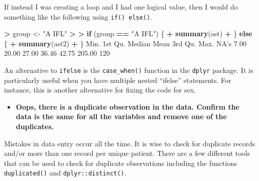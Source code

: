 \documentclass[
]{book}
\newenvironment{Shaded}{\begin{snugshade}}{\end{snugshade}}
\newcommand{\ControlFlowTok}[1]{\textcolor[rgb]{0.13,0.29,0.53}{\textbf{#1}}}
\newcommand{\DecValTok}[1]{\textcolor[rgb]{0.00,0.00,0.81}{#1}}
\newcommand{\ErrorTok}[1]{\textcolor[rgb]{0.64,0.00,0.00}{\textbf{#1}}}
\newcommand{\KeywordTok}[1]{\textcolor[rgb]{0.13,0.29,0.53}{\textbf{#1}}}
\newcommand{\NormalTok}[1]{#1}
\newcommand{\OperatorTok}[1]{\textcolor[rgb]{0.81,0.36,0.00}{\textbf{#1}}}
\newcommand{\OtherTok}[1]{\textcolor[rgb]{0.56,0.35,0.01}{#1}}
\newcommand{\StringTok}[1]{\textcolor[rgb]{0.31,0.60,0.02}{#1}}
\providecommand{\tightlist}{%
  \setlength{\itemsep}{0pt}\setlength{\parskip}{0pt}}
\begin{document}
If instead I was creating a loop and I had one logical value, then I would do something like the following using \texttt{if()\ else()}.

\begin{Shaded}
\begin{Highlighting}[]
\OperatorTok{>}\StringTok{ }\NormalTok{group <-}\StringTok{ "A IFL"}
\OperatorTok{>}\StringTok{ }
\ErrorTok{>}\StringTok{ }\ControlFlowTok{if}\NormalTok{ (group }\OperatorTok{==}\StringTok{ "A IFL"}\NormalTok{) \{}
\OperatorTok{+}\StringTok{     }\KeywordTok{summary}\NormalTok{(ast)}
\OperatorTok{+}\StringTok{ }\NormalTok{\} }\ControlFlowTok{else}\NormalTok{ \{}
\OperatorTok{+}\StringTok{     }\KeywordTok{summary}\NormalTok{(ast2)}
\OperatorTok{+}\StringTok{ }\NormalTok{\}}
\NormalTok{   Min. 1st Qu.  Median    Mean 3rd Qu.    Max.    NA}\StringTok{'s }
\StringTok{   7.00   20.00   27.00   36.46   42.75  205.00     120 }
\end{Highlighting}
\end{Shaded}

An alternative to \texttt{ifelse} is the \texttt{case\_when()} function in the \texttt{dplyr} package. It is particularly useful when you have multiple nested ``ifelse'' statements. For instance, this is another alternative for fixing the code for sex.

\begin{Shaded}
\end{Shaded}

\begin{itemize}
\tightlist
\item
  \textbf{Oops, there is a duplicate observation in the data. Confirm the data is the same for all the variables and remove one of the duplicates.}
\end{itemize}

Mistakes in data entry occur all the time. It is wise to check for duplicate records and/or more than one record per unique patient. There are a few different tools that can be used to check for duplicate observations including the functions \texttt{duplicated()} and \texttt{dplyr::distinct()}.
\end{document}
